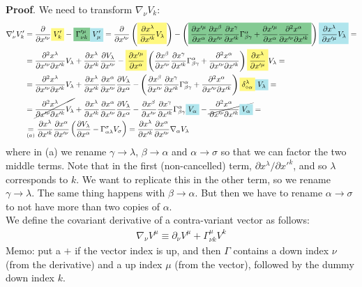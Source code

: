 \documentclass[../template.tex]{subfiles}
\begin{document}
\textbf{Proof}. We need to transform $\nabla_\nu V_k$:
\begin{align*}
    \nabla_\nu' V_k' &= \pdv{x'^\nu} \hlc{Yellow}{V_k'} -\hlc{ForestGreen}{ \Gamma'^\mu_{\nu k}} \hlc{SkyBlue}{V_\mu'} = \pdv{x'^\nu}\left(\hlc{Yellow}{\pdv{x^\lambda}{x'^k}V_\lambda}\right) - \left(\hlc{ForestGreen}{
    \pdv{x'^\mu}{x^\alpha} \pdv{x^\beta}{x'^\nu} \pdv{x^\gamma}{x'^k} \Gamma^\alpha_{\beta \gamma} + \pdv{x'^\mu}{x^\alpha} \pdv{x^\alpha}{x'^\nu}{x'^k}}
    \right) \hlc{SkyBlue}{\pdv{x^\lambda}{x'^\mu} V_\lambda} =\\
    &= \pdv{x^\lambda}{x'^\nu}{x'^k} V_\lambda + \pdv{x^\lambda}{x'^k}\pdv{V_\lambda}{x'^\nu} - \hlc{Yellow}{\pdv{x'^\mu}{x^\alpha}}\left(\pdv{x^\beta}{x'^\nu}\pdv{x^\gamma}{x'^k} \Gamma^\alpha_{\beta \gamma} + \pdv{x^\alpha}{x'^\nu}{x'^k}\right)\hlc{Yellow}{ \pdv{x^\lambda}{x'^\mu}} V_\lambda =\\
    &=\pdv{x^\lambda}{x'^\nu}{x'^k} V_\lambda + \pdv{x^\lambda}{x'^k}\pdv{x^\alpha}{x'^\nu}\pdv{V_\lambda}{x^\alpha} - \left(\pdv{x^\beta}{x'^\nu} \pdv{x^\gamma}{x'^k} \Gamma^\alpha_{\beta \gamma} + \pdv{x^\alpha}{x'^\nu}{x'^k}\right) \hlc{Yellow}{\delta^\lambda_{\diamond \alpha} }\hlc{SkyBlue}{V_\lambda} =\\
    &= \cancel{\pdv{x^\lambda}{x'^\nu}{x'^k} V_\lambda} + \pdv{x^\lambda}{x'^k}\pdv{x^\alpha}{x'^\nu} \pdv{V_\lambda}{x^\alpha} - \pdv{x^\beta}{x'^\nu} \pdv{x^\gamma}{x'^k} \Gamma^\alpha_{\beta \gamma} \hlc{SkyBlue}{V_\alpha }- \cancel{\pdv{x^\alpha}{x'^\nu}{x'^k} \hlc{SkyBlue}{V_\alpha}} =\\
    &\underset{(a)}{=}  \pdv{x^\lambda}{x'^k} \pdv{x^\alpha}{x'^\nu} \left(\pdv{V_\lambda}{x^\alpha} - \Gamma^\sigma_{\alpha \lambda} V_\sigma \right) = \pdv{x^\lambda}{x'^k} \pdv{x^\alpha}{x'^\nu}\nabla_\alpha V_\lambda
\end{align*}  
where in (a) we rename $\gamma \to \lambda$, $\beta \to \alpha$ and $\alpha \to \sigma$ so that we can factor the two middle terms. Note that in the first (non-cancelled) term, $\partial x^\lambda/\partial x'^{k}$, and so $\lambda$ corresponds to $k$. We want to replicate this in the other term, so we rename $ \gamma \to \lambda$. The same thing happens with $\beta \to \alpha$. But then we have to rename $\alpha \to \sigma$ to not have more than two copies of $\alpha$.\\


We define the covariant derivative of a contra-variant vector as follows:
\begin{align*}
    \nabla_\nu V^\mu \equiv \partial_\nu V^\mu + \Gamma_{\nu k} ^\mu V^k
\end{align*}
Memo: put a $+$ if the vector index is up, and then $\Gamma$ contains a down index $\nu$ (from the derivative) and a up index $\mu$ (from the vector), followed by the dummy down index $k$.\\
\end{document}
